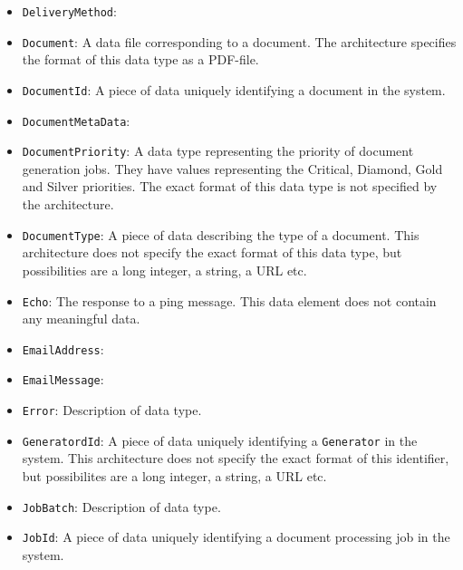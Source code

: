\documentclass[a4paper,10pt]{article}
\begin{document}
\begin{itemize}
	\item \texttt{DeliveryMethod}:
	
	\item \texttt{Document}: A data file corresponding to a document.  The architecture specifies the format of this data type as a PDF-file. 
	
	\item \texttt{DocumentId}: A piece of data uniquely identifying a document in the system.

	\item \texttt{DocumentMetaData}: 
	
	\item \texttt{DocumentPriority}: A data type representing the priority of document generation jobs. They have values representing the Critical, Diamond, Gold and Silver priorities. The exact format of this data type is not specified by the architecture.
	
	\item \texttt{DocumentType}: A piece of data describing the type of a document. This architecture does not specify the exact format of this data type, but possibilities are a long integer, a string, a URL etc.
	
	\item \texttt{Echo}: The response to a ping message. This data element does not contain any meaningful data.
	
	\item \texttt{EmailAddress}:
	
	\item \texttt{EmailMessage}:
	
	\item \texttt{Error}: Description of data type.
	
    \item \texttt{GeneratordId}: A piece of data uniquely identifying a \texttt{Generator} in the system. This architecture does not specify the exact format of this identifier, but possibilites are a long integer, a string, a URL etc.
    
    \item \texttt{JobBatch}: Description of data type.
    
    \item \texttt{JobId}: A piece of data uniquely identifying a document processing job in the system.
    

\end{itemize}
\end{document}
